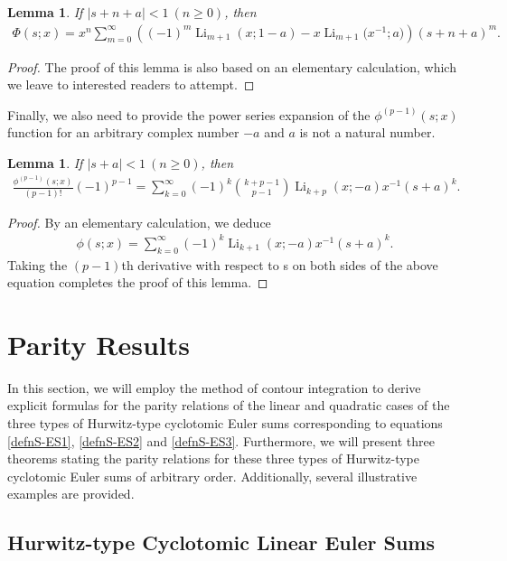 \documentclass[11pt]{article}
\let\oldsection\section
\renewcommand\section{\setcounter{equation}{0}\oldsection}
\DeclareMathOperator{\Li}{Li}
\theoremstyle{plain}
\newtheorem{lem}[thm]{Lemma}
\theoremstyle{definition}
\begin{document}
\begin{lem}\label{lem-extend-xuzhou-two} If $|s+n+a|<1\ (n\geq 0)$, then
\begin{align}
\Phi(s;x)=x^n \sum_{m=0}^\infty \left((-1)^m \Li_{m+1}(x;1-a)-x \Li_{m+1}\Big(x^{-1};a\Big) \right)(s+n+a)^m.
\end{align}
\end{lem}
\begin{proof}
The proof of this lemma is also based on an elementary calculation, which we leave to interested readers to attempt.
\end{proof}

Finally, we also need to provide the power series expansion of the $\phi^{(p-1)}(s;x)$ function for an arbitrary complex number $-a$ and $a$ is not a natural number.
\begin{lem}\label{lem-extend-xuzhou-three} If $|s+a|<1\ (n\geq 0)$, then
\begin{align}
\frac{\phi^{(p-1)}(s;x)}{(p-1)!}(-1)^{p-1}=\sum_{k=0}^\infty (-1)^k\binom{k+p-1}{p-1}\Li_{k+p}(x;-a)x^{-1}(s+a)^k.
\end{align}
\end{lem}
\begin{proof}
By an elementary calculation, we deduce
\begin{align*}
\phi(s;x)=\sum_{k=0}^\infty (-1)^k\Li_{k+1}(x;-a)x^{-1}(s+a)^k.
\end{align*}
Taking the $(p-1)$th derivative with respect to s on both sides of the above equation completes the proof of this lemma.
\end{proof}

\section{Parity Results}
In this section, we will employ the method of contour integration to derive explicit formulas for the parity relations of the linear and quadratic cases of the three types of Hurwitz-type cyclotomic Euler sums corresponding to equations \eqref{defnS-ES1}, \eqref{defnS-ES2} and \eqref{defnS-ES3}. Furthermore, we will present three theorems stating the parity relations for these three types of Hurwitz-type cyclotomic Euler sums of arbitrary order. Additionally, several illustrative examples are provided.

\subsection{Hurwitz-type Cyclotomic Linear Euler Sums}
\end{document}
